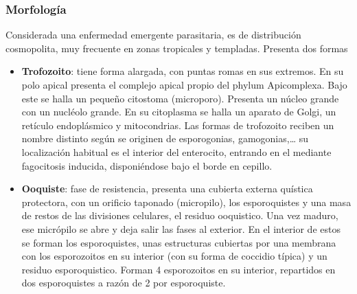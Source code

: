 \subsubsection{Morfología}
Considerada  una enfermedad emergente parasitaria, es de distribución cosmopolita, muy frecuente en zonas tropicales y templadas. Presenta dos formas 
\begin{itemize}[itemsep=0pt,parsep=0pt,topsep=0pt,partopsep=0pt]
	\item \textbf{Trofozoito}: tiene forma alargada, con puntas romas en sus extremos. En su polo apical presenta el complejo apical propio del phylum Apicomplexa. Bajo este se halla un pequeño citostoma (microporo). Presenta un núcleo grande con un nucléolo grande. En su citoplasma se halla un aparato de Golgi, un retículo endoplásmico y mitocondrias. Las formas de trofozoito reciben un nombre distinto según se originen de esporogonias, gamogonias,… su localización habitual es el interior del enterocito, entrando en el mediante fagocitosis inducida, disponiéndose bajo el borde en cepillo.
	\item \textbf{Ooquiste}: fase de resistencia, presenta una cubierta externa quística protectora, con un orificio taponado (micropilo), los esporoquistes y una masa de restos de las divisiones celulares, el residuo ooquistico. Una vez maduro, ese micrópilo se abre y deja salir las fases al exterior. En el interior de estos se forman los esporoquistes, unas estructuras cubiertas por una membrana con los esporozoitos en su interior (con su forma de coccidio típica) y un residuo esporoquistico. Forman 4 esporozoitos en su interior, repartidos en dos esporoquistes a razón de 2 por esporoquiste.
\end{itemize}
